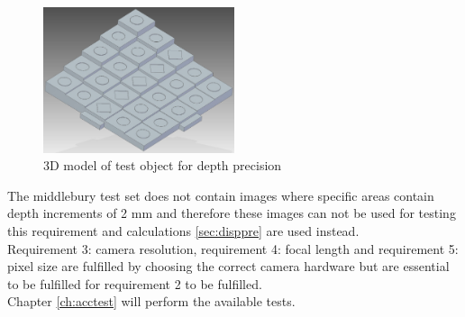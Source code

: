 \begin{figure}[ht!]
  \centering
  \includegraphics[width=0.5\textwidth]{figures/3dprecisiontest}
  \caption{3D model of test object for depth precision}
  \label{fig:3dpretest}
\end{figure}
The middlebury test set does not contain images where specific areas contain depth increments of 2 mm and therefore these images can not be used for testing this requirement and calculations \vref{sec:disppre} are used instead. \\


Requirement 3: camera resolution, requirement 4: focal length and requirement 5: pixel size are fulfilled by choosing the correct camera hardware but are essential to be fulfilled for requirement 2 to be fulfilled.\\

Chapter \vref{ch:acctest} will perform the available tests.

